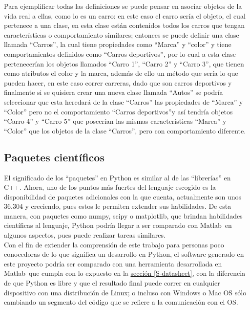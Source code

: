 \documentclass[11pt,lettersize]{article} %
\newcommand{\seccion}[1]{\hyperref[{#1}]{sección \ref*{#1}}}
\begin{document}
Para ejemplificar todas las definiciones se puede pensar en asociar objetos de la vida real a ellas, como lo es un carro: en este caso el carro sería el objeto, el cual pertenece a una clase, en esta clase están contenidos todos los carros que tengan características o comportamiento similares; entonces se puede definir una clase llamada “Carros”, la cual tiene propiedades como “Marca” y “color” y tiene comportamientos definidos como “Carros deportivos”, por lo cual a esta clase pertenecerían los objetos llamados “Carro 1”, “Carro 2” y “Carro 3”, que tienen como atributos el color y la marca, además de ello un método que sería lo que pueden hacer, en este caso correr carreras, dado que son carros deportivos y finalmente si se quisiera crear una nueva clase llamada “Autos” se podría seleccionar que esta heredará de la clase “Carros” las propiedades de “Marca” y “Color” pero no el comportamiento “Carros deportivos”y así tendría objetos “Carro 4” y “Carro 5” que poseerían las mismas características “Marca” y “Color” que los objetos de la clase “Carros”, pero con comportamiento diferente.

\subsection{Paquetes científicos}
El significado de los ``paquetes'' en Python es similar al de las ``librerías'' en C++. Ahora, uno de los puntos más fuertes del lenguaje escogido es la disponibilidad de paquetes adicionales con la que cuenta,  actualmente son unos 36.304\cite{PythonIndex} y creciendo, pues estos le permiten extender sus habilidades. De esta manera, con paquetes como numpy, scipy o matplotlib, que brindan habilidades científicas al lenguaje, Python podría llegar a ser comparado con Matlab\textregistered\ en algunos aspectos, pues puede realizar tareas similares.\\

Con el fin de extender la comprensión de este trabajo para personas poco conocedoras de lo que significa un desarrollo en Python, el software generado en este proyecto podría ser comparado con una herramienta desarrollada en Matlab\textregistered\ que cumpla con lo expuesto en la \seccion{S-datasheet}, con la diferencia de que Python es libre y que el resultado final puede correr en cualquier dispositivo con una distribución de Linux; o incluso con Windows o Mac OS sólo cambiando un segmento del código que se refiere a la comunicación con el OS.\\
\end{document}
